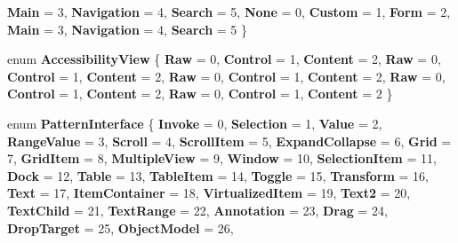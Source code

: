 \begin{DoxyCompactItemize}
{\bfseries Main} = 3, 
{\bfseries Navigation} = 4, 
{\bfseries Search} = 5, 
\newline
{\bfseries None} = 0, 
{\bfseries Custom} = 1, 
{\bfseries Form} = 2, 
{\bfseries Main} = 3, 
\newline
{\bfseries Navigation} = 4, 
{\bfseries Search} = 5
 \}
\item 
\mbox{\label{namespace_windows_1_1_u_i_1_1_xaml_1_1_automation_1_1_peers_aaf97ef41301cdde06f4cd3f8213a5478}} 
enum {\bfseries Accessibility\+View} \{ \newline
{\bfseries Raw} = 0, 
{\bfseries Control} = 1, 
{\bfseries Content} = 2, 
{\bfseries Raw} = 0, 
\newline
{\bfseries Control} = 1, 
{\bfseries Content} = 2, 
{\bfseries Raw} = 0, 
{\bfseries Control} = 1, 
\newline
{\bfseries Content} = 2, 
{\bfseries Raw} = 0, 
{\bfseries Control} = 1, 
{\bfseries Content} = 2, 
\newline
{\bfseries Raw} = 0, 
{\bfseries Control} = 1, 
{\bfseries Content} = 2
 \}
\item 
\mbox{\label{namespace_windows_1_1_u_i_1_1_xaml_1_1_automation_1_1_peers_a4cd1632dc1195eae46e115d12298a6a7}} 
enum {\bfseries Pattern\+Interface} \{ \newline
{\bfseries Invoke} = 0, 
{\bfseries Selection} = 1, 
{\bfseries Value} = 2, 
{\bfseries Range\+Value} = 3, 
\newline
{\bfseries Scroll} = 4, 
{\bfseries Scroll\+Item} = 5, 
{\bfseries Expand\+Collapse} = 6, 
{\bfseries Grid} = 7, 
\newline
{\bfseries Grid\+Item} = 8, 
{\bfseries Multiple\+View} = 9, 
{\bfseries Window} = 10, 
{\bfseries Selection\+Item} = 11, 
\newline
{\bfseries Dock} = 12, 
{\bfseries Table} = 13, 
{\bfseries Table\+Item} = 14, 
{\bfseries Toggle} = 15, 
\newline
{\bfseries Transform} = 16, 
{\bfseries Text} = 17, 
{\bfseries Item\+Container} = 18, 
{\bfseries Virtualized\+Item} = 19, 
\newline
{\bfseries Text2} = 20, 
{\bfseries Text\+Child} = 21, 
{\bfseries Text\+Range} = 22, 
{\bfseries Annotation} = 23, 
\newline
{\bfseries Drag} = 24, 
{\bfseries Drop\+Target} = 25, 
{\bfseries Object\+Model} = 26, 

\end{DoxyCompactItemize}
